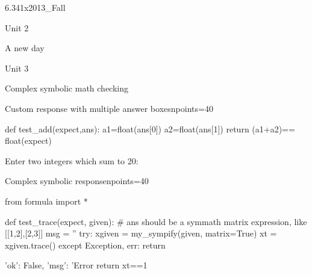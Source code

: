 \documentclass[12pt]{article}
\begin{document}
\begin{edXcourse}{6.341x}{2013_Fall}
\begin{edXchapter}{Unit 2}

\begin{edXsection}{A new day}





\end{edXsection}
\end{edXchapter}

\begin{edXchapter}{Unit 3}

\begin{edXsection}{Complex symbolic math checking}


\begin{edXproblem}{Custom response with multiple answer boxes}{npoints=40}

\begin{edXscript}
def test_add(expect,ans):
  a1=float(ans[0])
  a2=float(ans[1])
  return (a1+a2)== float(expect)
\end{edXscript}

Enter two integers which sum to 20:



\end{edXproblem}


\begin{edXproblem}{Complex symbolic response}{npoints=40}

\begin{edXscript}
from formula import *

def test_trace(expect, given):
    # ans should be a symmath matrix expression, like [[1,2],[2,3]]
    msg = ''
    try:
        xgiven = my_sympify(given, matrix=True)
        xt = xgiven.trace()
    except Exception, err:
        return {'ok': False, 'msg': 'Error %
    return xt==1

}
\end{edXscript}
\end{edXproblem}
\end{edXsection}
\end{edXchapter}
\end{edXcourse}
\end{document}
